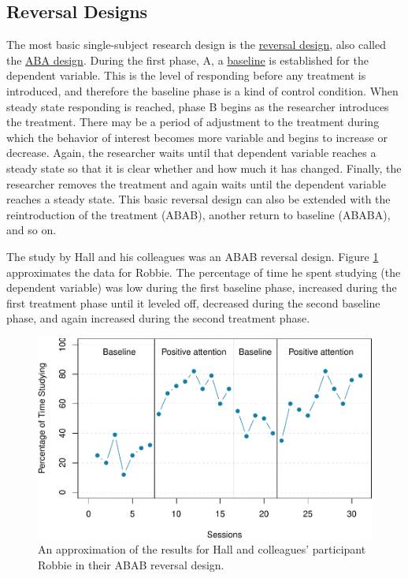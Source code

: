 \documentclass[
]{krantz}
\begin{document}
\hypertarget{reversal-designs}{%
\subsection*{Reversal Designs}\label{reversal-designs}}


The most basic single-subject research design is the \protect\hyperlink{reversal-design}{reversal design}, also called the \protect\hyperlink{aba-design}{ABA design}. During the first phase, A, a \protect\hyperlink{baseline}{baseline} is established for the dependent variable. This is the level of responding before any treatment is introduced, and therefore the baseline phase is a kind of control condition. When steady state responding is reached, phase B begins as the researcher introduces the treatment. There may be a period of adjustment to the treatment during which the behavior of interest becomes more variable and begins to increase or decrease. Again, the researcher waits until that dependent variable reaches a steady state so that it is clear whether and how much it has changed. Finally, the researcher removes the treatment and again waits until the dependent variable reaches a steady state. This basic reversal design can also be extended with the reintroduction of the treatment (ABAB), another return to baseline (ABABA), and so on.

The study by Hall and his colleagues was an ABAB reversal design. Figure \ref{fig:abab} approximates the data for Robbie. The percentage of time he spent studying (the dependent variable) was low during the first baseline phase, increased during the first treatment phase until it leveled off, decreased during the second baseline phase, and again increased during the second treatment phase.

\begin{figure}

{\centering \includegraphics[width=0.7\linewidth]{10-single-N_files/figure-latex/abab-1} 

}

\caption{An approximation of the results for Hall and colleagues’ participant Robbie in their ABAB reversal design.}\label{fig:abab}
\end{figure}
\end{document}
